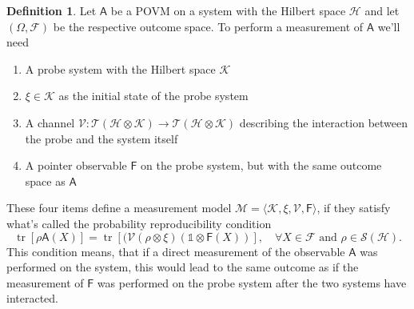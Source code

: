 \documentclass[a4paper,12pt]{wihuri}
\theoremstyle{definition}
\newtheorem{definition}{Definition}
\numberwithin{definition}{section}
\numberwithin{example}{section}
\numberwithin{theorem}{section}
\numberwithin{proposition}{section}
\numberwithin{lemma}{section}
\newcommand{\hi}{\mathcal{H}}%
\newcommand{\ki}{\mathcal{K}}%
\newcommand{\salg}{\mathcal{F}}%
\newcommand{\tc}{\mathcal{T}}%
\newcommand{\tila}{\mathcal{S}}%
\newcommand{\mm}{\mathcal{M}}%
\newcommand{\V}{\mathcal{V}}%
\newcommand{\A}{\mathsf{A}}%
\newcommand{\F}{\mathsf{F}}%
\newcommand{\id}{\mathds{1}}
\DeclareMathOperator{\tr}{tr}
\begin{document}
\begin{definition}
Let $\A$ be a POVM on a system with the Hilbert space $\hi$ and let $(\Omega, \salg)$ be the respective outcome space. To perform a measurement of $\A$ we'll need
\begin{enumerate}[$\bullet$]
\item A probe system with the Hilbert space $\ki$
\item $\xi \in \ki$ as the initial state of the probe system
\item A channel $\V : \tc(\hi \otimes \ki) \rightarrow \tc(\hi \otimes \ki)$ describing the interaction between the probe and the system itself
\item A pointer observable $\F$ on the probe system, but with the same outcome space as $\A$
\end{enumerate}
These four items define a measurement model $\mm = \langle \ki, \xi, \V, \F \rangle$, if they satisfy what's called the probability reproducibility condition
\begin{equation}\label{probability_reproducibility}
\tr[\rho \A(X)] = \tr[(\V(\rho \otimes \xi)(\id \otimes \F (X))], \quad \forall X \in \salg\text{ and }\rho \in \tila(\hi)\text{.} 
\end{equation}
This condition means, that if a direct measurement of the observable $\A$ was performed on the system, this would lead to the same outcome as if the measurement of $\F$ was performed on the probe system after the two systems have interacted.

\end{definition}
\end{document}

